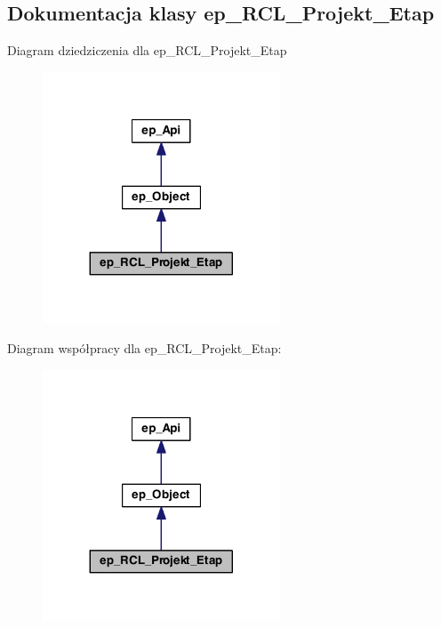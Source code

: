 \hypertarget{classep___r_c_l___projekt___etap}{\subsection{Dokumentacja klasy ep\-\_\-\-R\-C\-L\-\_\-\-Projekt\-\_\-\-Etap}
\label{classep___r_c_l___projekt___etap}
}


Diagram dziedziczenia dla ep\-\_\-\-R\-C\-L\-\_\-\-Projekt\-\_\-\-Etap\nopagebreak
\begin{figure}[H]
\begin{center}
\leavevmode
\includegraphics[width=200pt]{classep___r_c_l___projekt___etap__inherit__graph}
\end{center}
\end{figure}


Diagram współpracy dla ep\-\_\-\-R\-C\-L\-\_\-\-Projekt\-\_\-\-Etap\-:\nopagebreak
\begin{figure}[H]
\begin{center}
\leavevmode
\includegraphics[width=200pt]{classep___r_c_l___projekt___etap__coll__graph}
\end{center}
\end{figure}
